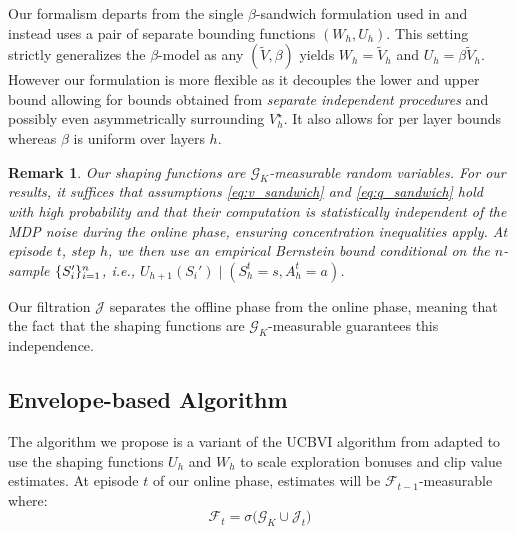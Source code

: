 \documentclass[twoside]{article}
\newtheorem{remark}{Remark}
\DeclarePairedDelimiter{\crl}{\{}{\}}
\newcommand{\lowv}{W} %
\newcommand{\highv}{U} %
\begin{document}
Our formalism departs from the single $\beta$-sandwich formulation used in \cite{gupta_unpacking_2022} and instead uses a pair of separate bounding functions $(\lowv_{h} , \highv_{h})$. This setting strictly generalizes the $\beta$-model as any $(\widetilde{V}, \beta)$ yields $\lowv_{h} {=} \widetilde{V}_h$ and $\highv_{h} {=} \beta\widetilde{V}_h$. However our formulation is more flexible as it decouples the lower and upper bound allowing for bounds obtained from \emph{separate independent procedures} and possibly even asymmetrically surrounding $V_h^\star$. It also allows for per layer bounds whereas $\beta$ is uniform over layers $h$.

\begin{remark}
    Our shaping functions are $\mathcal{G}_K$-measurable random variables. For our results, it suffices that assumptions \eqref{eq:v_sandwich} and \eqref{eq:q_sandwich} hold with high probability and that their computation is statistically independent of the MDP noise during the online phase, ensuring concentration inequalities apply. At episode $t$, step $h$, we then use an empirical Bernstein bound conditional on the $n$-sample $\crl{S_i'}_{i=1}^n$, i.e., $\highv_{h+1}(S_i') \mid (S_h^t{=}s, A_h^t{=}a)$.
\end{remark}

Our filtration \(\mathcal{J}\) separates the offline phase from the online phase, meaning that the fact that the shaping functions are $\mathcal{G}_K$-measurable guarantees this independence.

\subsection{Envelope-based Algorithm}

The algorithm we propose is a variant of the UCBVI algorithm from \cite{azar_minimax_2017} adapted to use the shaping functions $\highv_{h}$ and $\lowv_{h}$ to scale exploration bonuses and clip value estimates. At episode $t$ of our online phase, estimates will be $\mathcal{F}_{t-1}$-measurable where: 
\[\mathcal{F}_t {=} \sigma \bigl ( \mathcal{G}_{K} \cup \mathcal{J}_t \bigr ) \] 
\end{document}
